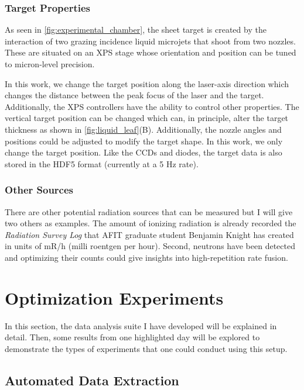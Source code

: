 \subsubsection{Target Properties}

As seen in \autoref{fig:experimental_chamber}, the sheet target is created by the interaction of two grazing incidence liquid microjets that shoot from two nozzles. These  are situated on an XPS stage whose orientation and position can be tuned to micron-level precision. 

In this work, we change the target position along the laser-axis direction which changes the distance between the peak focus of the laser and the target. Additionally, the XPS controllers have the ability to control other properties. The vertical target position can be changed which can, in principle, alter the target thickness as shown in \autoref{fig:liquid_leaf}(B). Additionally, the nozzle angles and positions could be adjusted to modify the target shape. In this work, we only change the target position. Like the \gls{CCD}s and diodes, the target data is also stored in the \gls{HDF5} format (currently at a 5 Hz rate).

\subsubsection{Other Sources}
There are other potential radiation sources that can be measured but I will give two others as examples. The amount of ionizing radiation is already recorded the \emph{Radiation Survey Log} that AFIT graduate student Benjamin Knight has created in units of mR/h (milli roentgen per hour). Second, neutrons have been detected \cite{Knight_2024_HPLSE} and optimizing their counts could give insights into high-repetition rate fusion.

\section{Optimization Experiments} \label{sec:daq_results}

In this section, the data analysis suite I have developed will be explained in detail. Then, some results from one highlighted day will be explored to demonstrate the types of experiments that one could conduct using this setup.

\subsection{Automated Data Extraction}

